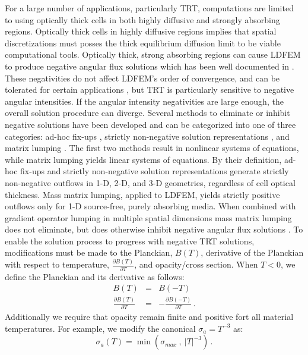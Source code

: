 \documentclass[final,3p,times]{elsarticle}
\newcommand{\benum}{\begin{equation}} 			%
\newcommand{\eenum}{\end{equation}}
\newcommand{\beanum}{\begin{eqnarray}}  %
\newcommand{\eeanum}{\end{eqnarray}}
\newcommand{\abs}[1]{\ensuremath{\left\lvert #1 \right\rvert}}  %
\newcommand{\pep}{\, .}
\begin{document}
For a large number of applications, particularly TRT, computations are limited to using optically thick cells in both highly diffusive and strongly absorbing regions.
Optically thick cells in highly diffusive regions implies that spatial discretizations must posses the thick equilibrium diffusion limit to be viable computational tools.
Optically thick, strong absorbing regions can cause  LDFEM to produce negative angular flux solutions which has been well documented in \cite{adams,hamilton,csz}.  
These negativities do not affect LDFEM's order of convergence, and can be tolerated for certain applications \cite{lathrop}, but TRT is particularly sensitive to negative angular intensities.
If the angular intensity negativities are large enough, the overall solution procedure can diverge.  
Several methods to eliminate or inhibit negative solutions have been developed and can be categorized into one of three categories: ad-hoc fix-ups  \cite{hamilton}, strictly non-negative solution representations \cite{csz}, and matrix lumping \cite{adams}.  
The first two methods result in nonlinear systems of equations, while matrix lumping yields linear systems of equations.  
By their definition, ad-hoc fix-ups and strictly non-negative solution representations generate strictly non-negative outflows in 1-D, 2-D, and 3-D geometries, regardless of cell optical thickness.  
Mass matrix lumping, applied to LDFEM, yields strictly positive outflows only for 1-D source-free, purely absorbing media.
When combined with gradient operator lumping in multiple spatial dimensions mass matrix lumping does not eliminate, but does otherwise inhibit negative angular flux solutions \cite{adams}.
To enable the solution process to progress with negative TRT solutions, modifications must be made to the Planckian, $B(T)$, derivative of the Planckian with respect to temperature, $\frac{\partial B(T)}{\partial T}$, and opacity/cross section.  When $T<0$, we define the Planckian and its derivative as follows:
\beanum
B(T) &=& B(-T) \\
\frac{\partial B(T)}{\partial T} &=& -\frac{\partial B(-T)}{\partial T} \pep
\eeanum
Additionally we require that opacity remain finite and positive fort all material temperatures.  For example, we modify the canonical $\sigma_a = T^{-3}$ as:
\benum
\sigma_a(T) = \min\left( \sigma_{max} ~, ~\abs{T}^{-3} \right) \pep
\eenum
\end{document}
